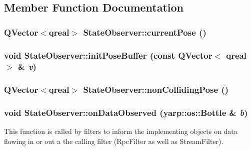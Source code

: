 \subsection{Member Function Documentation}
\hypertarget{class_state_observer_afe5862adf3afcea5598258625c5db003}{
\subsubsection[{currentPose}]{\setlength{\rightskip}{0pt plus 5cm}QVector$<$qreal$>$ StateObserver::currentPose ()}}
\label{class_state_observer_afe5862adf3afcea5598258625c5db003}
\hypertarget{class_state_observer_ab41baf5be5f7486796adbbdc0014985b}{
\subsubsection[{initPoseBuffer}]{\setlength{\rightskip}{0pt plus 5cm}void StateObserver::initPoseBuffer (const QVector$<$ qreal $>$ \& {\em v})}}
\label{class_state_observer_ab41baf5be5f7486796adbbdc0014985b}
\hypertarget{class_state_observer_ac77f03f2f6c059e03cb1d5553a4e645d}{
\subsubsection[{nonCollidingPose}]{\setlength{\rightskip}{0pt plus 5cm}QVector$<$qreal$>$ StateObserver::nonCollidingPose ()}}
\label{class_state_observer_ac77f03f2f6c059e03cb1d5553a4e645d}
\hypertarget{class_state_observer_af104fa553abf31754d9acc084e9aa31f}{
\subsubsection[{onDataObserved}]{\setlength{\rightskip}{0pt plus 5cm}void StateObserver::onDataObserved (yarp::os::Bottle \& {\em b})}}
\label{class_state_observer_af104fa553abf31754d9acc084e9aa31f}
This function is called by filters to inform the implementing objects on data flowing in or out a the calling filter (RpcFilter as well as StreamFilter). 

